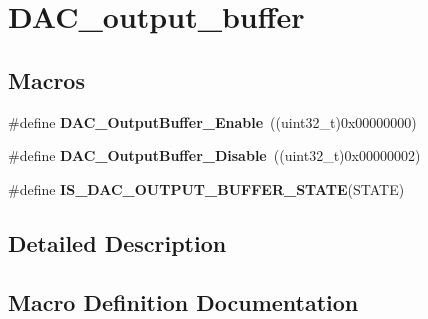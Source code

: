 \hypertarget{group___d_a_c__output__buffer}{}\section{D\+A\+C\+\_\+output\+\_\+buffer}
\label{group___d_a_c__output__buffer}
\subsection*{Macros}
\begin{DoxyCompactItemize}
\item 
\hypertarget{group___d_a_c__output__buffer_gab3f92803a8b6bc5fb3e4859908b5161f}{}\#define {\bfseries D\+A\+C\+\_\+\+Output\+Buffer\+\_\+\+Enable}~((uint32\+\_\+t)0x00000000)\label{group___d_a_c__output__buffer_gab3f92803a8b6bc5fb3e4859908b5161f}

\item 
\hypertarget{group___d_a_c__output__buffer_gad41f919d7141398cfdedf8218ce64450}{}\#define {\bfseries D\+A\+C\+\_\+\+Output\+Buffer\+\_\+\+Disable}~((uint32\+\_\+t)0x00000002)\label{group___d_a_c__output__buffer_gad41f919d7141398cfdedf8218ce64450}

\item 
\#define {\bfseries I\+S\+\_\+\+D\+A\+C\+\_\+\+O\+U\+T\+P\+U\+T\+\_\+\+B\+U\+F\+F\+E\+R\+\_\+\+S\+T\+A\+T\+E}(S\+T\+A\+T\+E)
\end{DoxyCompactItemize}


\subsection{Detailed Description}


\subsection{Macro Definition Documentation}
\hypertarget{group___d_a_c__output__buffer_gaa5a56816d641129fb62d11133c9dcccd}{}
